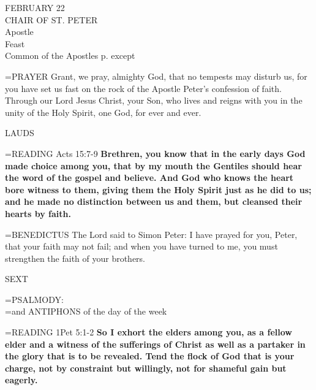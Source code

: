 \begin{center}\normalsize FEBRUARY 22\\
\footnotesize CHAIR OF ST. PETER\\
\footnotesize Apostle\\
\footnotesize Feast\\
\footnotesize Common of the Apostles p. \pageref{common:apostles} except\\
\end{center}

\hangindent=\parindent \small{PRAYER 
Grant, we pray, almighty God,
that no tempests may disturb us,
for you have set us fast
on the rock of the Apostle Peter's confession of faith.
Through our Lord Jesus Christ, your Son,
who lives and reigns with you in the unity of the Holy Spirit,
one God, for ever and ever.\\}
 
\begin{flushleft}\normalsize LAUDS\\\end{flushleft}

\hangindent=\parindent \small{READING} Acts 15:7-9 \textbf{Brethren, you know that in the early days God
made choice among you, that by my mouth the Gentiles should
hear the word of the gospel and believe. And God who knows the
heart bore witness to them, giving them the Holy Spirit just as he
did to us; and he made no distinction between us and them, but
cleansed their hearts by faith.\\}
 
\hangindent=\parindent \small{BENEDICTUS  The Lord said to Simon Peter: I have prayed for you,
Peter, that your faith may not fail; and when you have turned to
me, you must strengthen the faith of your brothers.\\}
 
\begin{flushleft}\normalsize SEXT\\\end{flushleft}

\hangindent=\parindent \small{PSALMODY:}\\
\hangindent=\parindent  and ANTIPHONS of the day of the week\vspace{0.5em}

\hangindent=\parindent \small{READING} 1Pet 5:1-2 \textbf{So I exhort the elders among you, as a fellow elder
and a witness of the sufferings of Christ as well as a partaker in
the glory that is to be revealed. Tend the flock of God that is your
charge, not by constraint but willingly, not for shameful gain but
eagerly.}
 

